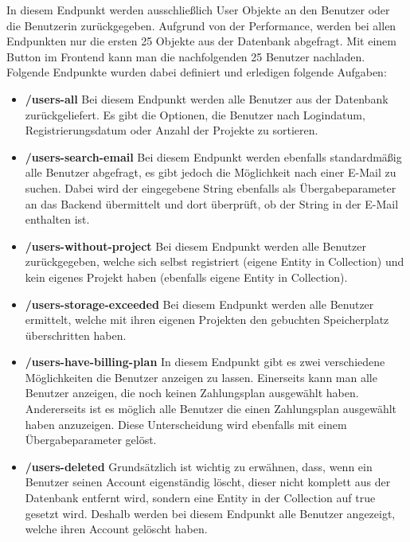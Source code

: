 In diesem Endpunkt werden ausschließlich User Objekte an den Benutzer oder die Benutzerin zurückgegeben. Aufgrund von der Performance, werden bei allen Endpunkten nur die ersten 25 Objekte aus der Datenbank abgefragt. Mit einem Button im Frontend kann man die nachfolgenden 25 Benutzer nachladen. Folgende Endpunkte wurden dabei definiert und erledigen folgende Aufgaben:
\begin{itemize}
    \item \textbf{/users-all}
        \newline
        Bei diesem Endpunkt werden alle Benutzer aus der Datenbank zurückgeliefert. Es gibt die Optionen, die Benutzer nach Logindatum, Registrierungsdatum oder Anzahl der Projekte zu sortieren.
    \item \textbf{/users-search-email}
        \newline
        Bei diesem Endpunkt werden ebenfalls standardmäßig alle Benutzer abgefragt, es gibt jedoch die Möglichkeit nach einer E-Mail zu suchen. Dabei wird der eingegebene String ebenfalls als Übergabeparameter an das Backend übermittelt und dort überprüft, ob der String in der E-Mail enthalten ist.
    \item \textbf{/users-without-project}
        \newline
        Bei diesem Endpunkt werden alle Benutzer zurückgegeben, welche sich selbst registriert (eigene Entity in Collection) und kein eigenes Projekt haben (ebenfalls eigene Entity in Collection).
    \item \textbf{/users-storage-exceeded}
        \newline
        Bei diesem Endpunkt werden alle Benutzer ermittelt, welche mit ihren eigenen Projekten den gebuchten Speicherplatz überschritten haben.
    \item \textbf{/users-have-billing-plan}
        \newline
        In diesem Endpunkt gibt es zwei verschiedene Möglichkeiten die Benutzer anzeigen zu lassen. Einerseits kann man alle Benutzer anzeigen, die noch keinen Zahlungsplan ausgewählt haben. Andererseits ist es möglich alle Benutzer die einen Zahlungsplan ausgewählt haben anzuzeigen. Diese Unterscheidung wird ebenfalls mit einem Übergabeparameter gelöst.
    \item \textbf{/users-deleted}
        \newline
        Grundsätzlich ist wichtig zu erwähnen, dass, wenn ein Benutzer seinen Account eigenständig löscht, dieser nicht komplett aus der Datenbank entfernt wird, sondern eine Entity in der Collection auf true gesetzt wird. Deshalb werden bei diesem Endpunkt alle Benutzer angezeigt, welche ihren Account gelöscht haben.

\end{itemize}
